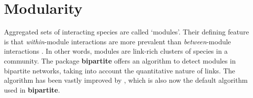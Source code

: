 \documentclass[a4paper, 11pt]{article}\usepackage[]{graphicx}\usepackage[]{color}
\newcommand{\package}[1]{\textbf{#1}}
\begin{document}
\section{Modularity}
Aggregated sets of interacting species are called `modules'. Their defining feature is that \emph{within}-module interactions are more prevalent than \emph{between}-module interactions \citep{Newman2003,Newman2004,Fortunato2010}. In other words, modules are link-rich clusters of species in a community. The package \package{bipartite} offers an algorithm \citep[QuaBiMo, described in technical detail here in][]{Dormann2013} to detect modules in bipartite networks, taking into account the quantitative nature of links. The algorithm has been vastly improved by \citep{Beckett2016}, which is also now the default algorithm used in \package{bipartite}.
\end{document}

